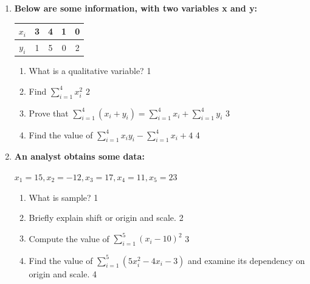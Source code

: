 \documentclass[a4paper,oneside]{book}
\begin{document}
\begin{enumerate}
  \begin{enumerate}
    \item
	What is a quantitative variable? \hfill 1
    \item
	What is the notation to denote his total number of goals? \hfill 2
    \item  
	Compute $\displaystyle \sum_{i=1}^5 (y_i - 3)^2$ \hfill 
    \item
	Find total number of goals using two different notations and examine whether they match. \hfill 4
  \end{enumerate}

  
 \item
	  \textbf{Below are some information, with two variables x and y:} 
  

  \begin{table}[h]
\centering
\begin{tabular}{c|c|c|c|c}
$x_i$ & 3 & 4 & 1 & 0 \\ \hline
$y_i$ & 1 & 5 & 0 & 2 \\
\end{tabular}
\end{table}
  \begin{enumerate}
    \item
	What is a qualitative variable? \hfill 1
    \item
	Find $\displaystyle \sum_{i=1}^{4}x_i^2$ \hfill 2
    \item  
	Prove that $\displaystyle \sum_{i=1}^{4} (x_i+y_i) = \sum_{i=1}^{4}x_i + \sum_{i=1}^{4}y_i $ \hfill 3
    \item
	Find the value of $\displaystyle \sum_{i=1}^{4} x_iy_i-\sum_{i=1}^{4} x_i+4$ \hfill 4

  \end{enumerate}
  
   \item
	  \textbf{An analyst obtains some data:}
	  \begin{center}
	  $x_1=15, x_2=-12, x_3=17, x_4=11, x_5=23$
  \end{center}
  \begin{enumerate}
    \item
	What is sample? \hfill 1
    \item
	Briefly explain shift or origin and scale. \hfill 2
    \item  
	Compute the value of $\displaystyle \sum_{i=1}^5 (x_i-10)^2$ \hfill 3
    \item
	Find the value of $\displaystyle \sum_{i=1}^5 (5x_i^2-4x_i-3)$ and examine its dependency on origin and scale. \hfill 4
  \end{enumerate}


\end{enumerate}
\end{document}
